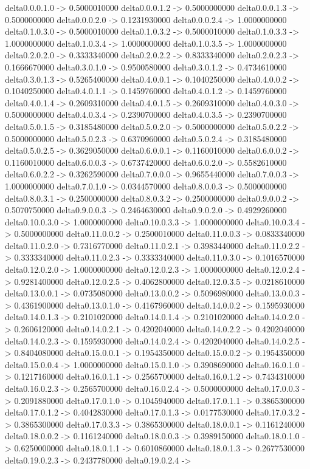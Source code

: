 delta0.0.0.1.0 -> 0.5000010000    delta0.0.0.1.2 -> 0.5000000000    delta0.0.0.1.3 -> 0.5000000000    delta0.0.0.2.0 -> 0.1231930000    delta0.0.0.2.4 -> 1.0000000000    delta0.1.0.3.0 -> 0.5000010000    delta0.1.0.3.2 -> 0.5000010000    delta0.1.0.3.3 -> 1.0000000000    delta0.1.0.3.4 -> 1.0000000000    delta0.1.0.3.5 -> 1.0000000000    delta0.2.0.2.0 -> 0.3333340000    delta0.2.0.2.2 -> 0.8333340000    delta0.2.0.2.3 -> 0.1666670000    delta0.3.0.1.0 -> 0.9500580000    delta0.3.0.1.2 -> 0.4734610000    delta0.3.0.1.3 -> 0.5265400000    delta0.4.0.0.1 -> 0.1040250000    delta0.4.0.0.2 -> 0.1040250000    delta0.4.0.1.1 -> 0.1459760000    delta0.4.0.1.2 -> 0.1459760000    delta0.4.0.1.4 -> 0.2609310000    delta0.4.0.1.5 -> 0.2609310000    delta0.4.0.3.0 -> 0.5000000000    delta0.4.0.3.4 -> 0.2390700000    delta0.4.0.3.5 -> 0.2390700000    delta0.5.0.1.5 -> 0.3185480000    delta0.5.0.2.0 -> 0.5000000000    delta0.5.0.2.2 -> 0.5000000000    delta0.5.0.2.3 -> 0.6370960000    delta0.5.0.2.4 -> 0.3185480000    delta0.5.0.2.5 -> 0.3629050000    delta0.6.0.0.1 -> 0.1160010000    delta0.6.0.0.2 -> 0.1160010000    delta0.6.0.0.3 -> 0.6737420000    delta0.6.0.2.0 -> 0.5582610000    delta0.6.0.2.2 -> 0.3262590000    delta0.7.0.0.0 -> 0.9655440000    delta0.7.0.0.3 -> 1.0000000000    delta0.7.0.1.0 -> 0.0344570000    delta0.8.0.0.3 -> 0.5000000000    delta0.8.0.3.1 -> 0.2500000000    delta0.8.0.3.2 -> 0.2500000000    delta0.9.0.0.2 -> 0.5070750000    delta0.9.0.0.3 -> 0.2464630000    delta0.9.0.2.0 -> 0.4929260000    delta0.10.0.3.0 -> 1.0000000000    delta0.10.0.3.3 -> 1.0000000000    delta0.10.0.3.4 -> 0.5000000000    delta0.11.0.0.2 -> 0.2500010000    delta0.11.0.0.3 -> 0.0833340000    delta0.11.0.2.0 -> 0.7316770000    delta0.11.0.2.1 -> 0.3983440000    delta0.11.0.2.2 -> 0.3333340000    delta0.11.0.2.3 -> 0.3333340000    delta0.11.0.3.0 -> 0.1016570000    delta0.12.0.2.0 -> 1.0000000000    delta0.12.0.2.3 -> 1.0000000000    delta0.12.0.2.4 -> 0.9281400000    delta0.12.0.2.5 -> 0.4062800000    delta0.12.0.3.5 -> 0.0218610000    delta0.13.0.0.1 -> 0.0735080000    delta0.13.0.0.2 -> 0.5096980000    delta0.13.0.0.3 -> 0.4361900000    delta0.13.0.1.0 -> 0.4167960000    delta0.14.0.0.2 -> 0.1595930000    delta0.14.0.1.3 -> 0.2101020000    delta0.14.0.1.4 -> 0.2101020000    delta0.14.0.2.0 -> 0.2606120000    delta0.14.0.2.1 -> 0.4202040000    delta0.14.0.2.2 -> 0.4202040000    delta0.14.0.2.3 -> 0.1595930000    delta0.14.0.2.4 -> 0.4202040000    delta0.14.0.2.5 -> 0.8404080000    delta0.15.0.0.1 -> 0.1954350000    delta0.15.0.0.2 -> 0.1954350000    delta0.15.0.0.4 -> 1.0000000000    delta0.15.0.1.0 -> 0.3908690000    delta0.16.0.1.0 -> 0.1217160000    delta0.16.0.1.1 -> 0.2565700000    delta0.16.0.1.2 -> 0.7434310000    delta0.16.0.2.3 -> 0.2565700000    delta0.16.0.2.4 -> 0.5000000000    delta0.17.0.0.3 -> 0.2091880000    delta0.17.0.1.0 -> 0.1045940000    delta0.17.0.1.1 -> 0.3865300000    delta0.17.0.1.2 -> 0.4042830000    delta0.17.0.1.3 -> 0.0177530000    delta0.17.0.3.2 -> 0.3865300000    delta0.17.0.3.3 -> 0.3865300000    delta0.18.0.0.1 -> 0.1161240000    delta0.18.0.0.2 -> 0.1161240000    delta0.18.0.0.3 -> 0.3989150000    delta0.18.0.1.0 -> 0.6250000000    delta0.18.0.1.1 -> 0.6010860000    delta0.18.0.1.3 -> 0.2677530000    delta0.19.0.2.3 -> 0.2437780000    delta0.19.0.2.4 -> 